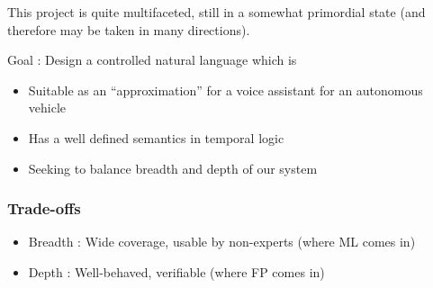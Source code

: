 \documentclass{beamer}
\begin{document}







\begin{frame}

\begin{exampleblock}{}
This project is quite multifaceted, still in a somewhat primordial state (and therefore may be taken in many directions).
\end{exampleblock}

\begin{block}{}
Goal : Design a controlled natural language which is 
\end{block}

\begin{itemize}
\item Suitable as an ``approximation'' for a voice assistant for an autonomous vehicle
\item Has a well defined semantics in temporal logic
\item Seeking to balance breadth and depth of our system
\end{itemize}

\end{frame}

\begin{frame}

\frametitle{Trade-offs}

\begin{itemize}
\item Breadth : Wide coverage, usable by non-experts (where ML comes in)
\item Depth   : Well-behaved, verifiable (where FP comes in)
\end{itemize}

\end{frame}
\end{document}
